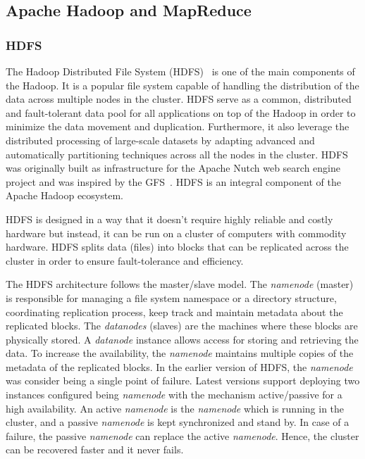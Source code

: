 \subsection{Apache Hadoop and MapReduce}

\subsubsection{HDFS}
\label{sec:hdfs}
The Hadoop Distributed File System (\gls{HDFS})~\cite{Shvachko:2010:HDF:1913798.1914427} is one of the main components of the Hadoop. 
It is a popular file system capable of handling the distribution of the data across multiple nodes in the cluster.
HDFS serve as a common, distributed and fault-tolerant data pool for all applications on top of the Hadoop in order to minimize the data movement and duplication.
Furthermore, it also leverage the distributed processing of large-scale datasets by adapting advanced and automatically partitioning techniques across all the nodes in the cluster.
\gls{HDFS} was originally built as infrastructure for the Apache Nutch web search engine project and was inspired by the \gls{GFS}~\cite{Ghemawat:2003:GFS:945445.945450}. 
\gls{HDFS} is an integral component of the Apache Hadoop ecosystem.

\gls{HDFS} is designed in a way that it doesn't require highly reliable and costly hardware but instead, it can be run on a cluster of computers with commodity hardware.
HDFS splits data (files) into blocks that can be replicated across the cluster in order to ensure fault-tolerance and efficiency.

The HDFS architecture follows the master/slave model. 
The \textit{namenode} (master) is responsible for managing a file system namespace or a directory structure, coordinating replication process, keep track and maintain metadata about the replicated blocks.
The \textit{datanodes} (slaves) are the machines where these blocks are physically stored.
A \textit{datanode} instance allows access for storing and retrieving the data. 
To increase the availability, the \textit{namenode} maintains multiple copies of the metadata of the replicated blocks.
In the earlier version of HDFS, the \textit{namenode} was consider being a single point of failure.
Latest versions support deploying two instances configured being \textit{namenode} with the mechanism active/passive for a high availability.
An active \textit{namenode} is the \textit{namenode} which is running in the cluster, and a passive \textit{namenode} is kept synchronized and stand by.
In case of a failure, the passive \textit{namenode} can replace the active \textit{namenode}.
Hence, the cluster can be recovered faster and it never fails.

